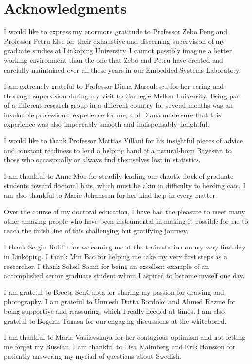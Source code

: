 \chapter*{Acknowledgments}

I would like to express my enormous gratitude to Professor Zebo Peng and
Professor Petru Else for their exhaustive and discerning supervision of my
graduate studies at Linköping University. I cannot possibly imagine a better
working environment than the one that Zebo and Petru have created and carefully
maintained over all these years in our Embedded Systems Laboratory.

I am extremely grateful to Professor Diana Marculescu for her caring and
thorough supervision during my visit to Carnegie Mellon University. Being part
of a different research group in a different country for several months was an
invaluable professional experience for me, and Diana made sure that this
experience was also impeccably smooth and indispensably delightful.

I would like to thank Professor Mattias Villani for his insightful pieces of
advice and constant readiness to lend a helping hand of a natural-born Bayesian
to those who occasionally or always find themselves lost in statistics.

I am thankful to Anne Moe for steadily leading our chaotic flock of graduate
students toward doctoral hats, which must be akin in difficulty to herding cats.
I am also thankful to Marie Johansson for her kind help in every matter.

Over the course of my doctoral education, I have had the pleasure to meet many
other amazing people who have been instrumental in making it possible for me to
reach the finish line of this challenging but gratifying journey.

I thank Sergiu Rafiliu for welcoming me at the train station on my very first
day in Linköping. I thank Min Bao for helping me take my very first steps as a
researcher. I thank Soheil Samii for being an excellent example of an
accomplished senior graduate student whom I aspired to become myself one day.

I am grateful to Breeta SenGupta for sharing my passion for drawing and
photography. I am grateful to Unmesh Dutta Bordoloi and Ahmed Rezine for being
supportive and reassuring, which I really needed at times. I am also grateful to
Bogdan Tanasa for our engaging discussions at the whiteboard.

I am thankful to Maria Vasilevskaya for her contagious optimism and not letting
me forget my Russian. I am thankful to Lisa Malmberg and Erik Hansson for
patiently answering my myriad of questions about Swedish.

